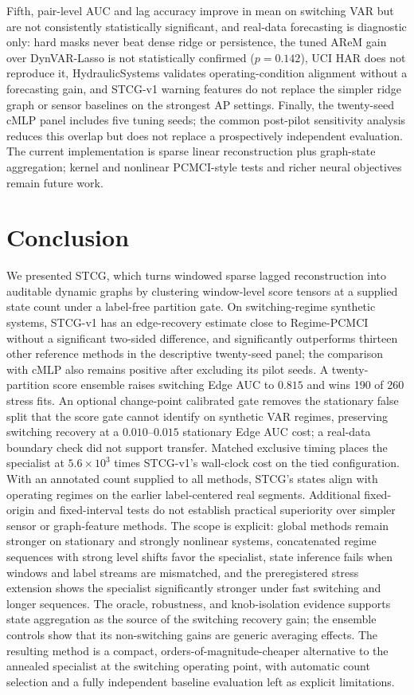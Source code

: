 \documentclass[sigconf,anonymous]{acmart}
\begin{document}
Fifth, pair-level AUC and lag accuracy improve in mean on switching VAR but are not consistently statistically significant, and real-data forecasting is diagnostic only: hard masks never beat dense ridge or persistence, the tuned AReM gain over DynVAR-Lasso is not statistically confirmed ($p=0.142$), UCI HAR does not reproduce it, HydraulicSystems validates operating-condition alignment without a forecasting gain, and STCG-v1 warning features do not replace the simpler ridge graph or sensor baselines on the strongest AP settings.
Finally, the twenty-seed cMLP panel includes five tuning seeds; the common post-pilot sensitivity analysis reduces this overlap but does not replace a prospectively independent evaluation. The current implementation is sparse linear reconstruction plus graph-state aggregation; kernel and nonlinear PCMCI-style tests and richer neural objectives remain future work.

\section{Conclusion}

We presented STCG, which turns windowed sparse lagged reconstruction into auditable dynamic graphs by clustering window-level score tensors at a supplied state count under a label-free partition gate.
On switching-regime synthetic systems, STCG-v1 has an edge-recovery estimate close to Regime-PCMCI without a significant two-sided difference, and significantly outperforms thirteen other reference methods in the descriptive twenty-seed panel; the comparison with cMLP also remains positive after excluding its pilot seeds. A twenty-partition score ensemble raises switching Edge AUC to $0.815$ and wins 190 of 260 stress fits. An optional change-point calibrated gate removes the stationary false split that the score gate cannot identify on synthetic VAR regimes, preserving switching recovery at a $0.010$--$0.015$ stationary Edge AUC cost; a real-data boundary check did not support transfer. Matched exclusive timing places the specialist at $5.6\times10^{3}$ times STCG-v1's wall-clock cost on the tied configuration. With an annotated count supplied to all methods, STCG's states align with operating regimes on the earlier label-centered real segments. Additional fixed-origin and fixed-interval tests do not establish practical superiority over simpler sensor or graph-feature methods.
The scope is explicit: global methods remain stronger on stationary and strongly nonlinear systems, concatenated regime sequences with strong level shifts favor the specialist, state inference fails when windows and label streams are mismatched, and the preregistered stress extension shows the specialist significantly stronger under fast switching and longer sequences.
The oracle, robustness, and knob-isolation evidence supports state aggregation as the source of the switching recovery gain; the ensemble controls show that its non-switching gains are generic averaging effects. The resulting method is a compact, orders-of-magnitude-cheaper alternative to the annealed specialist at the switching operating point, with automatic count selection and a fully independent baseline evaluation left as explicit limitations.
\end{document}
